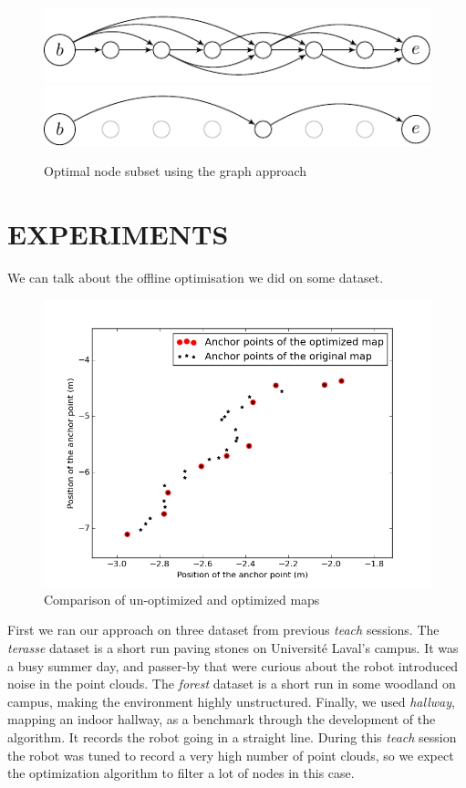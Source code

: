 \documentclass[letterpaper,10 pt,conference]{ieeeconf}
\begin{document}
\begin{figure}[thpb]
  \centering
  \includegraphics[scale=1.0]{unoptimized-graph}
  \includegraphics[scale=1.0]{optimized-graph}
  \caption{Optimal node subset using the graph approach}
\end{figure}


\section{EXPERIMENTS}
We can talk about the offline optimisation we did on some dataset.

\begin{figure}
  \centering
  \includegraphics[scale=0.4]{map_optimization}
  \caption{Comparison of un-optimized and optimized maps}
\end{figure}

First we ran our approach on three dataset from previous \textit{teach} sessions. The
\textit{terasse} dataset is a short run paving stones on Université Laval's campus. It was a busy
summer day, and passer-by that were curious about the robot introduced noise in the point
clouds. The \textit{forest} dataset is a short run in some woodland on campus, making the environment
highly unstructured. Finally, we used \textit{hallway}, mapping an indoor hallway, as a
benchmark through the development of the algorithm. It records the robot going in a straight line.
During this \textit{teach} session the robot was tuned to record a very high number of point clouds,
so we expect the optimization algorithm to filter a lot of nodes in this case.
\end{document}
